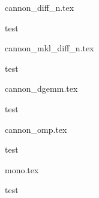 \begin{figure}[hb]
\centering
\footnotesize
{cannon_diff_n.tex}
\caption{test}
\end{figure}

\begin{figure}[hb]
\centering
\footnotesize
{cannon_mkl_diff_n.tex}
\caption{test}
\end{figure}

\begin{figure}[hb]
\centering
\footnotesize
{cannon_dgemm.tex}
\caption{test}
\end{figure}

\begin{figure}[hb]
\centering
\footnotesize
{cannon_omp.tex}
\caption{test}
\end{figure}

\begin{figure}[hb]
\centering
\footnotesize
{mono.tex}
\caption{test}
\end{figure}